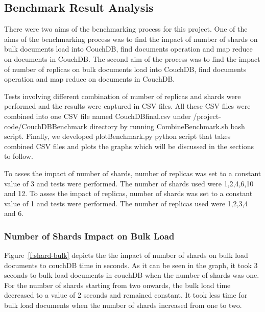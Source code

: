 \subsection{Benchmark Result Analysis}
There were two aims of the benchmarking process for this project. One
of the aims of the benchmarking process was to find the impact of
number of shards on bulk documents load into CouchDB, find documents
operation and map reduce on documents in CouchDB. The second aim of
the process was to find the impact of number of replicas on bulk
documents load into CouchDB, find documents operation and map reduce
on documents in CouchDB. 

Tests involving different combination of number of replicas and shards
were performed and the results were captured in CSV files. All these
CSV files were combined into one CSV file named CouchDBfinal.csv under
/project-code/CouchDBBenchmark directory by running
CombineBenchmark.sh bash script. Finally, we developed
plotBenchmark.py python script that takes combined CSV files and plots
the graphs which will be discussed in the sections to follow. 

To asses the impact of number of shards, number of replicas was set to a
constant value of 3 and tests were performed. The number of shards
used were 1,2,4,6,10 and 12. To asses the impact of replicas, number
of shards was set to a constant value of 1 and tests were
performed. The number of replicas used were 1,2,3,4 and 6.



\subsubsection{Number of Shards Impact on Bulk Load}


Figure~\ref{f:shard-bulk} depicts the the impact of number of shards
on bulk load documents to couchDB time in seconds. As it can be seen
in the graph, it took 3 seconds to bulk load documents in couchDB when
the number of shards was one. For the number of shards starting from
two onwards, the bulk load time decreased to a value of 2 seconds and remained
constant. It took less time for bulk load documents when the number of
shards increased from one to two.

